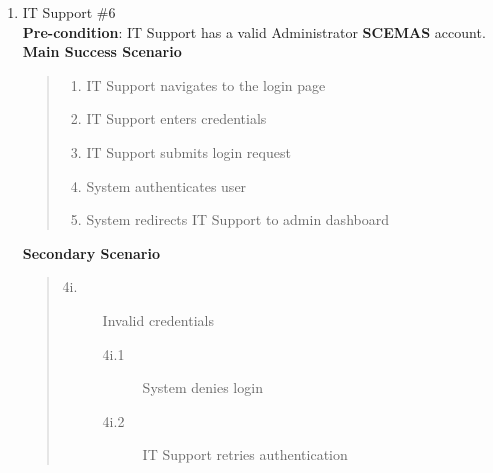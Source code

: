 \documentclass[]{article}
\begin{document}
\begin{enumerate}[{\bf BE10.}]
\begin{enumerate}[{\bf VP1.}]
            \item IT Support \#6\\
                \textbf{Pre-condition}: IT Support has a valid Administrator \textbf{SCEMAS} account.\\
                \textbf{Main Success Scenario}
                \begin{quote}
                    \begin{enumerate}[1.]
                        \item IT Support navigates to the login page
                        \item IT Support enters credentials
                        \item IT Support submits login request
                        \item System authenticates user
                        \item System redirects IT Support to admin dashboard
                    \end{enumerate}
                \end{quote}
                \textbf{Secondary Scenario}
                \begin{quote}
                    \begin{description}
                        \item[\textmd{4i.}] Invalid credentials
                        \begin{description}
                            \item[\textmd{4i.1}] System denies login
                            \item[\textmd{4i.2}] IT Support retries authentication
                        \end{description}
                    \end{description}
                \end{quote}
        \end{enumerate}


\end{enumerate}
\end{document}
